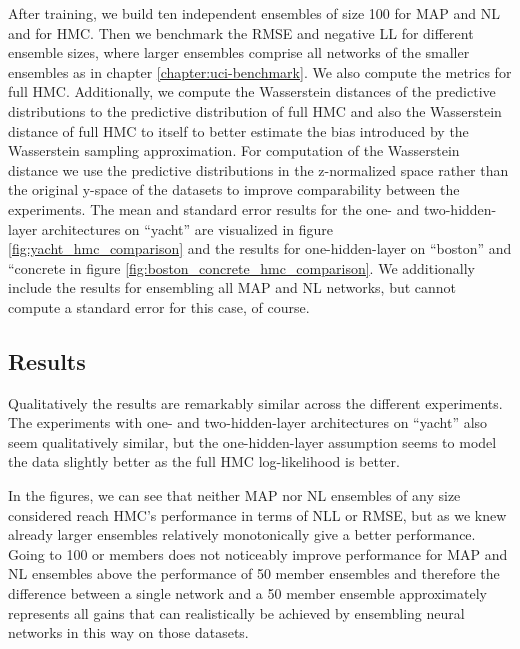 \documentclass[../thesis.tex]{subfiles}
\begin{document}
After training, we build ten independent ensembles of size 100 for MAP and NL and  for HMC. Then we benchmark the RMSE and negative LL for different ensemble sizes, where larger ensembles comprise all networks of the smaller ensembles as in chapter \ref{chapter:uci-benchmark}. We also compute the metrics for full HMC. Additionally, we compute the Wasserstein distances of the predictive distributions to the predictive distribution of full HMC and also the Wasserstein distance of full HMC to itself to better estimate the bias introduced by the Wasserstein sampling approximation. For computation of the Wasserstein distance we use the predictive distributions in the z-normalized space rather than the original y-space of the datasets to improve comparability between the experiments. The mean and standard error results for the one- and two-hidden-layer architectures on ``yacht'' are visualized in figure \ref{fig:yacht_hmc_comparison} and the results for one-hidden-layer on ``boston'' and ``concrete in figure \ref{fig:boston_concrete_hmc_comparison}. We additionally include the results for ensembling all  MAP and NL networks, but cannot compute a standard error for this case, of course.


\subsection*{Results}

% 
% 

Qualitatively the results are remarkably similar across the different experiments. The experiments with one- and two-hidden-layer architectures on ``yacht'' also seem qualitatively similar, but the one-hidden-layer assumption seems to model the data slightly better as the full HMC log-likelihood is better. 

In the figures, we can see that neither MAP nor NL ensembles of any size considered reach HMC's performance in terms of NLL or RMSE, but as we knew already larger ensembles relatively monotonically give a better performance. Going to 100 or  members does not noticeably improve performance for MAP and NL ensembles above the performance of 50 member ensembles and therefore the difference between a single network and a 50 member ensemble approximately represents all gains that can realistically be achieved by ensembling neural networks in this way on those datasets.
\end{document}
